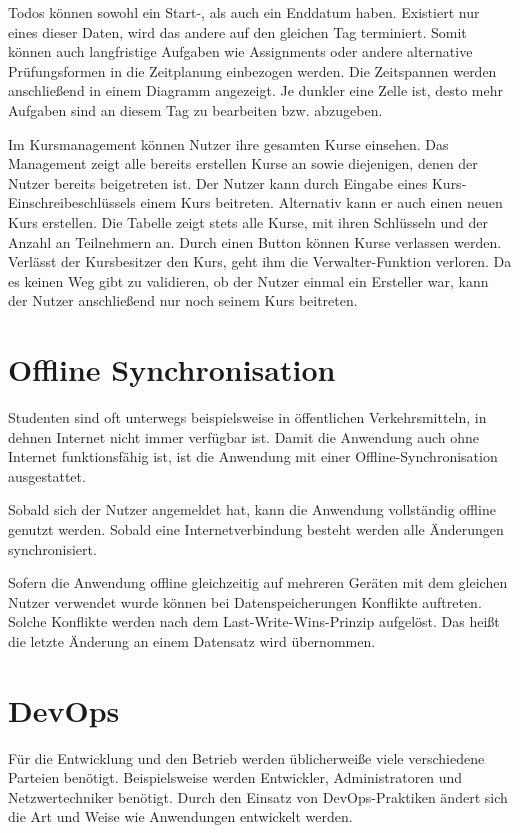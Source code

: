 Todos können sowohl ein Start-, als auch ein Enddatum haben.
Existiert nur eines dieser Daten, wird das andere auf den gleichen Tag terminiert.
Somit können auch langfristige Aufgaben wie Assignments oder andere alternative Prüfungsformen in die Zeitplanung einbezogen werden.
Die Zeitspannen werden anschließend in einem Diagramm angezeigt.
Je dunkler eine Zelle ist, desto mehr Aufgaben sind an diesem Tag zu bearbeiten bzw. abzugeben.



Im Kursmanagement können Nutzer ihre gesamten Kurse einsehen.
Das Management zeigt alle bereits erstellen Kurse an sowie diejenigen, denen der Nutzer bereits beigetreten ist.
Der Nutzer kann durch Eingabe eines Kurs-Einschreibeschlüssels einem Kurs beitreten.
Alternativ kann er auch einen neuen Kurs erstellen.
Die Tabelle zeigt stets alle Kurse, mit ihren Schlüsseln und der Anzahl an Teilnehmern an.
Durch einen Button können Kurse verlassen werden.
Verlässt der Kursbesitzer den Kurs, geht ihm die Verwalter-Funktion verloren.
Da es keinen Weg gibt zu validieren, ob der Nutzer einmal ein Ersteller war, kann der Nutzer anschließend nur noch seinem Kurs beitreten.




\section{Offline Synchronisation}
Studenten sind oft unterwegs beispielsweise in öffentlichen Verkehrsmitteln, in dehnen Internet nicht immer verfügbar ist.
Damit die Anwendung auch ohne Internet funktionsfähig ist, ist die Anwendung mit einer Offline-Synchronisation ausgestattet.

Sobald sich der Nutzer angemeldet hat, kann die Anwendung vollständig offline genutzt werden.
Sobald eine Internetverbindung besteht werden alle Änderungen synchronisiert.

Sofern die Anwendung offline gleichzeitig auf mehreren Geräten mit dem gleichen Nutzer verwendet wurde können bei Datenspeicherungen Konflikte auftreten.
Solche Konflikte werden nach dem Last-Write-Wins-Prinzip aufgelöst.
Das heißt die letzte Änderung an einem Datensatz wird übernommen.


\section{DevOps}
Für die Entwicklung und den Betrieb werden üblicherweiße viele verschiedene Parteien benötigt.
Beispielsweise werden Entwickler, Administratoren und Netzwertechniker benötigt.
Durch den Einsatz von DevOps-Praktiken ändert sich die Art und Weise wie Anwendungen entwickelt werden.

